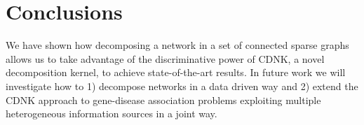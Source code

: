 \documentclass[review]{elsarticle}
\begin{document}
\section{Conclusions}
We have shown how decomposing a network in a set of connected sparse graphs allows us to take advantage of the discriminative power of CDNK, a novel decomposition kernel, to achieve state-of-the-art results. In future work we will investigate how to 1) decompose networks in a data driven way and 2) extend the CDNK approach to gene-disease association problems exploiting multiple heterogeneous information sources in a joint way.
%
%
%
\end{document}
